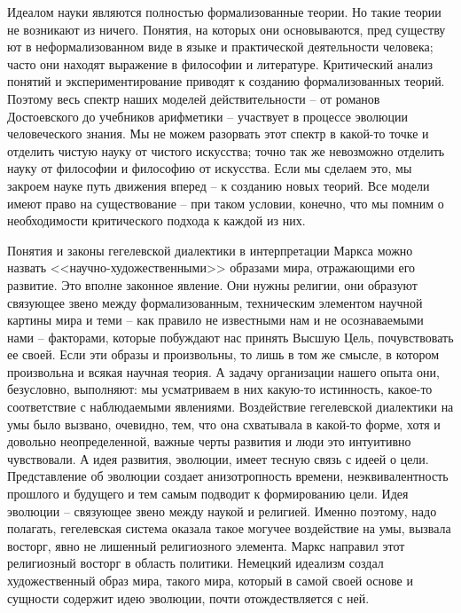 \documentclass{book}
\begin{document}
Идеалом науки являются полностью формализованные теории. Но такие теории не возникают из ничего. Понятия, на которых они основываются, пред существу ют в неформализованном виде в языке и практической деятельности человека; часто они находят выражение в философии и литературе. Критический анализ понятий и экспериментирование приводят к со­зданию формализованных теорий. Поэтому весь спектр наших моделей действительности -- от романов Достоевского до учебников арифметики -- участвует в процессе эволюции человече­ского знания. Мы не можем разорвать этот спектр в какой-то точке и отделить чистую науку от чистого искусства; точно так же невозможно отделить науку от философии и философию от искусства. Если мы сделаем это, мы закроем науке путь движения вперед -- к созданию новых теорий. Все модели имеют право на существование -- при таком условии, конечно, что мы помним о необходимости критического подхода к каждой из них.

Понятия и законы гегелевской диалектики в интерпретации Маркса можно назвать <<научно-художественными>> образами мира, отражающими его развитие. Это вполне законное явле­ние. Они нужны религии, они образуют связующее звено между формализованным, техническим элементом научной картины мира и теми -- как правило не известными нам и не осознавае­мыми нами -- факторами, которые побуждают нас принять Выс­шую Цель, почувствовать ее своей. Если эти образы и произ­вольны, то лишь в том же смысле, в котором произвольна и всякая научная теория. А задачу организации нашего опыта они, безусловно, выполняют: мы усматриваем в них какую-то истинность, какое-то соответствие с наблюдаемыми явлениями. Воздействие гегелевской диалектики на умы было вызвано, очевидно, тем, что она схватывала в какой-то форме, хотя и до­вольно неопределенной, важные черты развития и люди это интуитивно чувствовали. А идея развития, эволюции, имеет тес­ную связь с идеей о цели. Представление об эволюции создает анизотропность времени, 
неэквивалентность прошлого и будущего и тем самым подводит к формированию цели. Идея эволюции -- связующее звено между наукой и религией. Именно поэтому, надо полагать, гегелевская система оказала такое могучее воздействие на умы, вызвала восторг, явно не лишенный религиозного элемента. Маркс направил этот религиозный восторг в область политики. Немецкий идеализм создал художественный образ мира, такого мира, который в самой своей основе и сущности содержит идею эволюции, почти отождествляется с ней.
\end{document}
